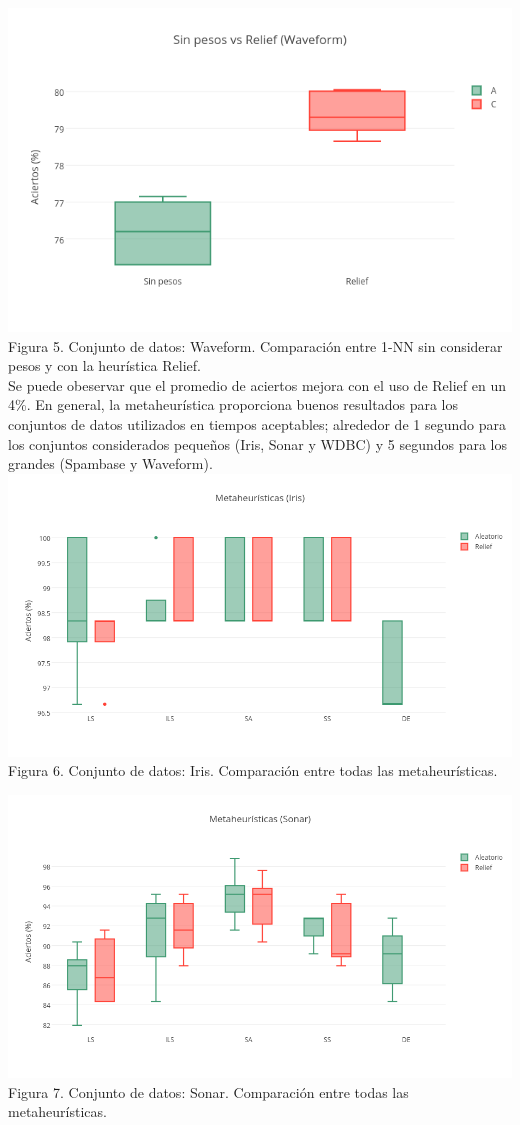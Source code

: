 \documentclass{ci5652}
\begin{document}
\includegraphics[width=\columnwidth]{no_weights-Relief_Waveform}
Figura 5. Conjunto de datos: Waveform. Comparación entre 1-NN sin considerar pesos y con la heurística Relief.\\

Se puede obeservar que el promedio de aciertos mejora con el uso de Relief en un 4\%. En general, la metaheurística proporciona buenos resultados para los conjuntos de datos utilizados en tiempos aceptables; alrededor de 1 segundo para los conjuntos considerados pequeños (Iris, Sonar y WDBC) y 5 segundos para los grandes (Spambase y Waveform).\\

\includegraphics[width=\columnwidth]{metaheuristicas_Iris}
Figura 6. Conjunto de datos: Iris. Comparación entre todas las metaheurísticas.

\includegraphics[width=\columnwidth]{metaheuristicas_Sonar}
Figura 7. Conjunto de datos: Sonar. Comparación entre todas las metaheurísticas.
\end{document}
